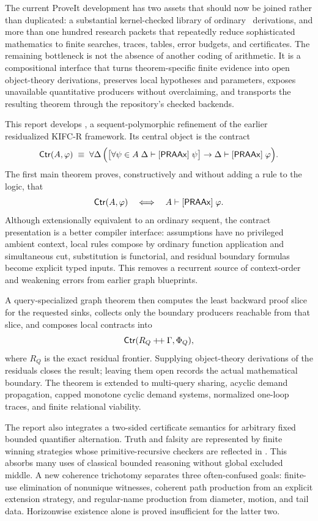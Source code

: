 The current ProveIt development has two assets that should now be joined rather than duplicated: a substantial kernel-checked library of ordinary \iPRA\ derivations, and more than one hundred research packets that repeatedly reduce sophisticated mathematics to finite searches, traces, tables, error budgets, and certificates.  The remaining bottleneck is not the absence of another coding of arithmetic.  It is a compositional interface that turns theorem-specific finite evidence into open object-theory derivations, preserves local hypotheses and parameters, exposes unavailable quantitative producers without overclaiming, and transports the resulting theorem through the repository's checked backends.

This report develops \KIFCS, a sequent-polymorphic refinement of the earlier residualized KIFC-R framework.  Its central object is the contract
\[
 \mathsf{Ctr}(A,\varphi)\;\equiv\;
 \forall\Delta\,\Bigl(\bigl[\forall\psi\in A\; \Delta\mathrel{\vdash[\mathsf{PRAAx}]}\psi\bigr]
     \to \Delta\mathrel{\vdash[\mathsf{PRAAx}]}\varphi\Bigr).
\]
The first main theorem proves, constructively and without adding a rule to the logic, that
\[
                 \mathsf{Ctr}(A,\varphi)\quad\Longleftrightarrow\quad
                 A\mathrel{\vdash[\mathsf{PRAAx}]}\varphi.
\]
Although extensionally equivalent to an ordinary sequent, the contract presentation is a better compiler interface: assumptions have no privileged ambient context, local rules compose by ordinary function application and simultaneous cut, substitution is functorial, and residual boundary formulas become explicit typed inputs.  This removes a recurrent source of context-order and weakening errors from earlier graph blueprints.

A query-specialized graph theorem then computes the least backward proof slice for the requested sinks, collects only the boundary producers reachable from that slice, and composes local contracts into
\[
        \mathsf{Ctr}(R_Q\mathbin{+\!+}\Gamma,\Phi_Q),
\]
where \(R_Q\) is the exact residual frontier.  Supplying object-theory derivations of the residuals closes the result; leaving them open records the actual mathematical boundary.  The theorem is extended to multi-query sharing, acyclic demand propagation, capped monotone cyclic demand systems, normalized one-loop traces, and finite relational viability.

The report also integrates a two-sided certificate semantics for arbitrary fixed bounded quantifier alternation.  Truth and falsity are represented by finite winning strategies whose primitive-recursive checkers are reflected in \iPRA.  This absorbs many uses of classical bounded reasoning without global excluded middle.  A new coherence trichotomy separates three often-confused goals: finite-use elimination of nonunique witnesses, coherent path production from an explicit extension strategy, and regular-name production from diameter, motion, and tail data.  Horizonwise existence alone is proved insufficient for the latter two.


